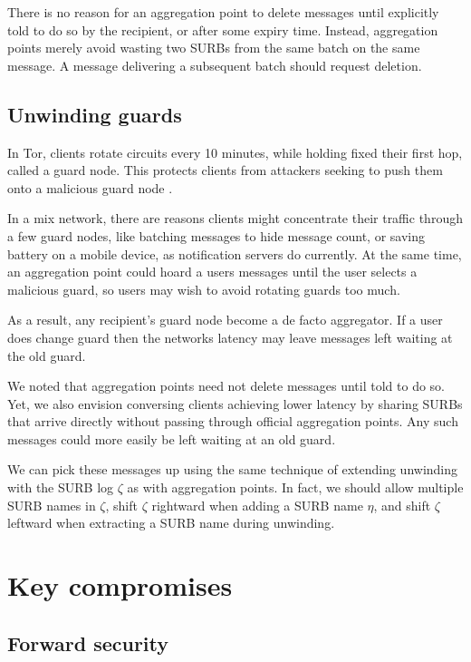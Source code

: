 \documentclass[twoside,letterpaper]{llncs}
\begin{document}
There is no reason for an aggregation point to delete messages
until explicitly told to do so by the recipient, or after some expiry
time.  Instead, aggregation points merely avoid wasting two SURBs
from the same batch on the same message.  A message delivering a
subsequent batch should request deletion. 

\subsection{Unwinding guards}

In Tor, clients rotate circuits every 10 minutes, while holding
fixed their first hop, called a guard node.  This protects clients
from attackers seeking to push them onto a malicious guard node
\cite{tor-guards}.

In a mix network, there are reasons clients might concentrate their
traffic through a few guard nodes, like batching messages to hide
message count, or saving battery on a mobile device, as notification
servers do currently.  At the same time, an aggregation point could
hoard a users messages until the user selects a malicious guard,
so users may wish to avoid rotating guards too much.

As a result, any recipient's guard node become a de facto aggregator.
If a user does change guard then the networks latency may leave
messages left waiting at the old guard.  

We noted that aggregation points need not delete messages until told
to do so.  Yet, we also envision conversing clients achieving lower 
latency by sharing SURBs that arrive directly without passing through
official aggregation points.  Any such messages could more easily be
left waiting at an old guard.  

We can pick these messages up using the same technique of extending
unwinding with the SURB log $\zeta$ as with aggregation points.
In fact, we should allow multiple SURB names in $\zeta$, shift
$\zeta$ rightward when adding a SURB name $\eta$, and shift $\zeta$
leftward when extracting a SURB name during unwinding.


\section{Key compromises}

\subsection{Forward security}
\end{document}
